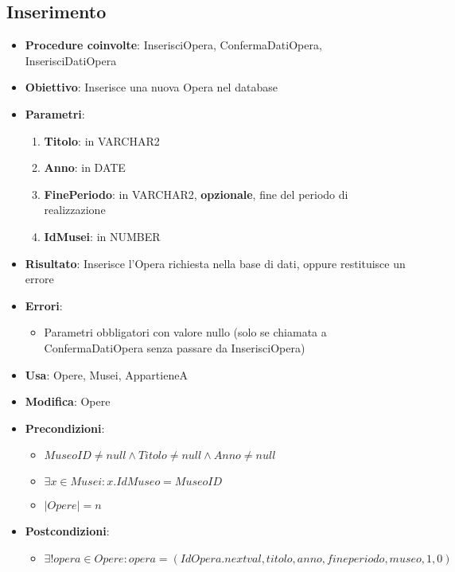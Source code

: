 \subsection{Inserimento}
\begin{itemize}
	\item \textbf{Procedure coinvolte}: InserisciOpera, ConfermaDatiOpera, InserisciDatiOpera
	\item \textbf{Obiettivo}: Inserisce una nuova Opera nel database
	\item \textbf{Parametri}:
	\begin{enumerate}
		\item \textbf{Titolo}: in VARCHAR2
		\item \textbf{Anno}: in DATE
		\item \textbf{FinePeriodo}: in VARCHAR2, \textbf{opzionale}, fine del periodo di realizzazione 
		\item \textbf{IdMusei}: in NUMBER
	\end{enumerate}
	\item \textbf{Risultato}: Inserisce l'Opera richiesta nella base di dati, oppure restituisce un errore
	\item \textbf{Errori}: 
	\begin{itemize}
		\item Parametri obbligatori con valore nullo (solo se chiamata a ConfermaDatiOpera senza passare da InserisciOpera)
	\end{itemize}
	\item \textbf{Usa}: Opere, Musei, AppartieneA
	\item \textbf{Modifica}: Opere
	\item \textbf{Precondizioni}:
	\begin{itemize}
		\item $MuseoID \ne null \land Titolo \ne null \land Anno \ne null$
		\item $\exists x \in Musei : x.IdMuseo = MuseoID$
		\item $|Opere| = n$
	\end{itemize}
	\item \textbf{Postcondizioni}:
	\begin{itemize}
		\item $\exists! opera \in Opere : opera = (IdOpera.nextval, titolo, anno, fineperiodo, museo, 1, 0)$
	\end{itemize}
\end{itemize}

